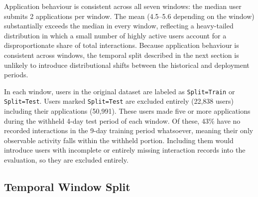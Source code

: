 Application behaviour is consistent across all seven windows: the 
median user submits 2 applications per window. The mean (4.5--5.6 depending on the window) substantially exceeds the median in every window, reflecting a 
heavy-tailed distribution in which a small number of highly active 
users account for a disproportionate share of total interactions. Because application behaviour is consistent across windows, the temporal split described in the next section is unlikely to introduce distributional shifts between the historical and deployment periods.

In each window, users in the original dataset are labeled as \texttt{Split=Train} or \texttt{Split=Test}. Users marked \texttt{Split=Test} are excluded 
entirely (22,838 users) including their applications (50,991). These users made five or more applications 
during the withheld 4-day test period of each window. Of these, 43\% 
have no recorded interactions in the 9-day training period whatsoever, 
meaning their only observable activity falls within the withheld 
portion. Including them would introduce users with incomplete or 
entirely missing interaction records into the evaluation, so they 
are excluded entirely.


\subsection{Temporal Window Split}
\label{sec:custom_split}

